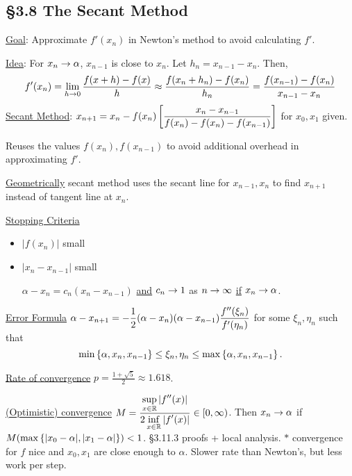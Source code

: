 \documentclass[]{article}
\begin{document}
\subsection*{\S3.8 The Secant Method}

\ul{Goal}: Approximate $f'(x_n)$ in Newton's method to avoid calculating $f'$.

\ul{Idea}: For $x_n\rightarrow\alpha$, $x_{n-1}$ is close to $x_n$.
Let $h_n=x_{n-1}-x_n$. Then, 
\begin{align*}
	f'(x_n) = \lim_{h\rightarrow0}\frac{f(x+h)-f(x)}h
	\approx \frac{f(x_n+h_n)-f(x_n)}{h_n}
	= \frac{f(x_{n-1})-f(x_n)}{x_{n-1}-x_n}
\end{align*}
\ul{Secant Method}: $\displaystyle x_{n+1} = x_n - f(x_n)\left[\frac{x_n-x_{n-1}}{f(x_n)-f(x_n)-f(x_{n-1})}\right] $ for $x_0,x_1$ given.
\begin{note}
	Reuses the values $f(x_n),f(x_{n-1})$ to avoid additional overhead in approximating $f'$.
\end{note}
\ul{Geometrically} secant method uses the secant line for $x_{n-1},x_n$ to find $x_{n+1}$ instead of tangent line at $x_n$.

\ul{Stopping Criteria}
\begin{itemize}
	\item $|f(x_n)|$ small
	\item $|x_n-x_{n-1}|$ small

		$\alpha - x_n = c_n(x_n-x_{n-1})$ \ul{and} $c_n\rightarrow1$ as $n\rightarrow\infty$ \ul{if} $x_n\rightarrow\alpha$.
\end{itemize}
\ul{Error Formula}
$\displaystyle\alpha - x_{n+1} = -\frac12(\alpha - x_n)(\alpha - x_{n-1}) \frac{f''(\xi_n)}{f'(\eta_n)}$ for some $\xi_n,\eta_n$ such that $$\min\left\{ \alpha,x_n,x_{n-1} \right\} \leq \xi_n,\eta_n \leq \max\left\{ \alpha,x_n,x_{n-1} \right\}.$$

\ul{Rate of convergence} $p = \frac{1+\sqrt5}2 \approx 1.618$.

\ul{(Optimistic) convergence} $\displaystyle M = \frac{\displaystyle\sup_{x\in\mathbb{R}}|f''(x)|}{\displaystyle2\inf_{x\in\mathbb{R}}|f'(x)|}\in[0,\infty)$.
Then $x_n\rightarrow\alpha$ if $M(\max\left\{ |x_0-\alpha|,|x_1-\alpha| \right\}) < 1$.
\S3.11.3 proofs + local analysis.
$*$ convergence for $f$ nice and $x_0,x_1$ are close enough to $\alpha$. Slower rate than Newton's, but less work per step.
\end{document}
